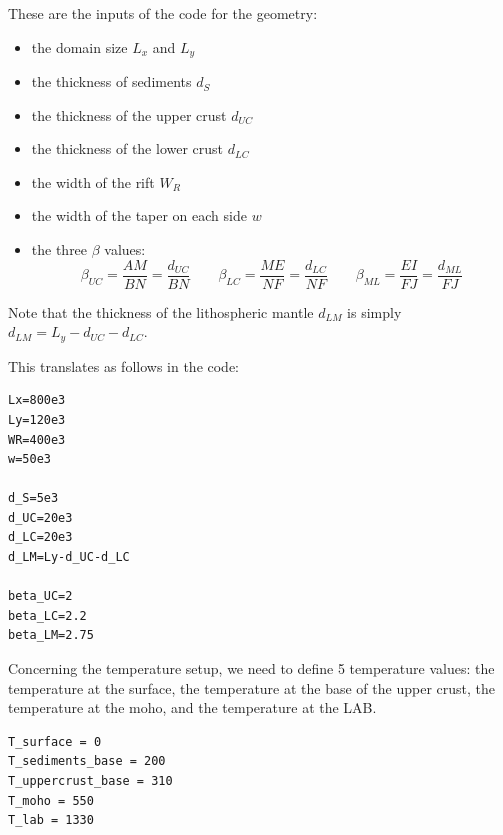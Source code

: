 These are the inputs of the code for the geometry:
\begin{itemize}
\item the domain size $L_x$ and $L_y$
\item the thickness of sediments $d_S$
\item the thickness of the upper crust $d_{UC}$
\item the thickness of the lower crust $d_{LC}$
\item the width of the rift $W_R$
\item the width of the taper on each side $w$
\item the three $\beta$ values:
\[
\beta_{UC} =\frac{AM}{BN} =\frac{d_{UC}}{BN}
\qquad
\beta_{LC} =\frac{ME}{NF} =\frac{d_{LC}}{NF}
\qquad 
\beta_{ML} =\frac{EI}{FJ} =\frac{d_{ML}}{FJ}
\]
\end{itemize}
Note that the thickness of the lithospheric mantle $d_{LM}$ is simply $d_{LM}=L_y-d_{UC}-d_{LC}$.

This translates as follows in the code:
\begin{lstlisting}
Lx=800e3
Ly=120e3
WR=400e3
w=50e3

d_S=5e3
d_UC=20e3
d_LC=20e3
d_LM=Ly-d_UC-d_LC

beta_UC=2
beta_LC=2.2
beta_LM=2.75
\end{lstlisting}

Concerning the temperature setup, we need to define 5 temperature values:
the temperature at the surface, the temperature at the base of the upper crust,
the temperature at the moho, and the temperature at the LAB.
\begin{lstlisting}
T_surface = 0
T_sediments_base = 200
T_uppercrust_base = 310
T_moho = 550
T_lab = 1330
\end{lstlisting}


